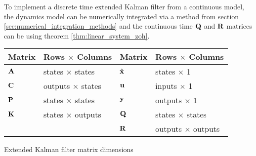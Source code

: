 \begin{remark}
  To implement a discrete time extended Kalman filter from a continuous model,
  the dynamics model can be numerically integrated via a method from section
  \ref{sec:numerical_integration_methods} and the continuous time $\mathbf{Q}$ and
  $\mathbf{R}$ matrices can be  using theorem
  \ref{thm:linear_system_zoh}.
\end{remark}
\begin{booktable}
  \begin{tabular}{|ll|ll|}
    \hline
    \rowcolor{headingbg}
    \textbf{Matrix} & \textbf{Rows $\times$ Columns} &
    \textbf{Matrix} & \textbf{Rows $\times$ Columns} \\
    \hline
    $\mathbf{A}$ & states $\times$ states & $\hat{\mathbf{x}}$ & states $\times$ 1 \\
    $\mathbf{C}$ & outputs $\times$ states & $\mathbf{u}$ & inputs $\times$ 1 \\
    $\mathbf{P}$ & states $\times$ states & $\mathbf{y}$ & outputs $\times$ 1 \\
    $\mathbf{K}$ & states $\times$ outputs & $\mathbf{Q}$ & states $\times$ states \\
              &                         & $\mathbf{R}$ & outputs $\times$ outputs \\
    \hline
  \end{tabular}
  \caption{Extended Kalman filter matrix dimensions}
\end{booktable}
